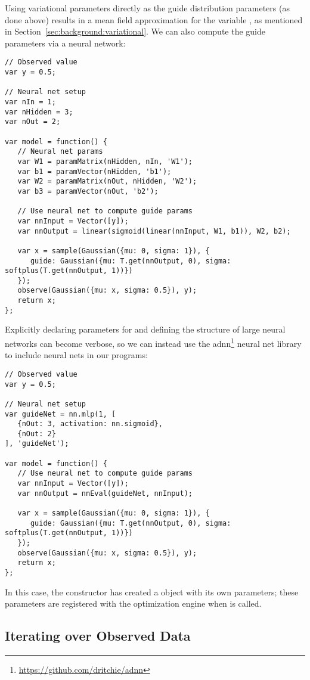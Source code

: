 Using variational parameters directly as the guide distribution parameters (as done above) results in a mean field approximation for the variable , as mentioned in Section~\ref{sec:background:variational}.
We can also compute the guide parameters via a neural network:
\begin{lstlisting}
// Observed value
var y = 0.5;

// Neural net setup
var nIn = 1;
var nHidden = 3;
var nOut = 2;

var model = function() {
   // Neural net params
   var W1 = paramMatrix(nHidden, nIn, 'W1');
   var b1 = paramVector(nHidden, 'b1');
   var W2 = paramMatrix(nOut, nHidden, 'W2');
   var b3 = paramVector(nOut, 'b2');

   // Use neural net to compute guide params
   var nnInput = Vector([y]);
   var nnOutput = linear(sigmoid(linear(nnInput, W1, b1)), W2, b2);

   var x = sample(Gaussian({mu: 0, sigma: 1}), {
      guide: Gaussian({mu: T.get(nnOutput, 0), sigma: softplus(T.get(nnOutput, 1))})
   });
   observe(Gaussian({mu: x, sigma: 0.5}), y);
   return x;
};
\end{lstlisting}
Explicitly declaring parameters for and defining the structure of large neural networks can become verbose, so we can instead use the adnn\footnote{\url{https://github.com/dritchie/adnn}} neural net library to include neural nets in our programs:
\begin{lstlisting}
// Observed value
var y = 0.5;

// Neural net setup
var guideNet = nn.mlp(1, [
   {nOut: 3, activation: nn.sigmoid},
   {nOut: 2}
], 'guideNet');

var model = function() {
   // Use neural net to compute guide params
   var nnInput = Vector([y]);
   var nnOutput = nnEval(guideNet, nnInput);

   var x = sample(Gaussian({mu: 0, sigma: 1}), {
      guide: Gaussian({mu: T.get(nnOutput, 0), sigma: softplus(T.get(nnOutput, 1))})
   });
   observe(Gaussian({mu: x, sigma: 0.5}), y);
   return x;
};
\end{lstlisting}
In this case, the  constructor has created a  object with its own parameters; these parameters are registered with the optimization engine when  is called.

\subsection{Iterating over Observed Data}

